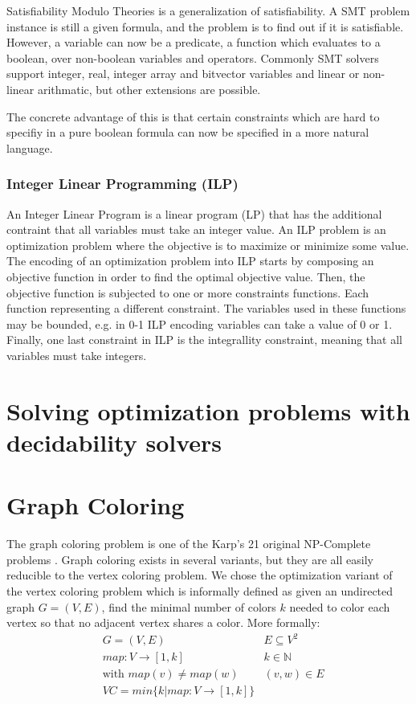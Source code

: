 \documentclass{sig-alternate}
\begin{document}
Satisfiability Modulo Theories is a generalization of satisfiability.
A SMT problem instance is still a given formula, and the problem is to find out if it is satisfiable.
However, a variable can now be a predicate, a function which evaluates to a boolean, over non-boolean variables and operators.
Commonly SMT solvers support integer, real, integer array and bitvector variables and linear or non-linear arithmatic, but other extensions are possible.

The concrete advantage of this is that certain constraints which are hard to specifiy in a pure boolean formula can now be specified in a more natural language.

\subsubsection*{Integer Linear Programming (ILP)}

An Integer Linear Program is a linear program (LP) that has the additional contraint that all variables must take an integer value. 
An ILP problem is an optimization problem where the objective is to maximize or minimize some value. 
The encoding of an optimization problem into ILP starts by composing an objective function in order to find the optimal objective value.
Then, the objective function is subjected to one or more constraints functions. Each function representing a different constraint.
The variables used in these functions may be bounded, e.g. in 0-1 ILP encoding variables can take a value of 0 or 1.
Finally, one last constraint in ILP is the integrallity constraint, meaning that all variables must take integers.

\section{Solving optimization problems with decidability solvers}

\section{Graph Coloring}

The graph coloring problem is one of the Karp's 21 original NP-Complete problems \cite{karp1972reducibility}.
Graph coloring exists in several variants, but they are all easily reducible to the vertex coloring problem. We chose the optimization variant of the vertex coloring problem which is informally defined as given an undirected graph $G = (V,E)$, find the minimal number of colors $k$ needed to color each vertex so that no adjacent vertex shares a color. More formally:
\begin{subequations}
\begin{align*}
        & G = (V,E) & E \subseteq V^2\\
        & map : V \rightarrow [1,k] & k \in \mathbb{N} \\
        & \text{with } map(v) \neq map(w) & (v,w) \in E \\
        & VC = min\{k | map : V \rightarrow [1,k]\}
\end{align*}
\end{subequations}
\end{document}
